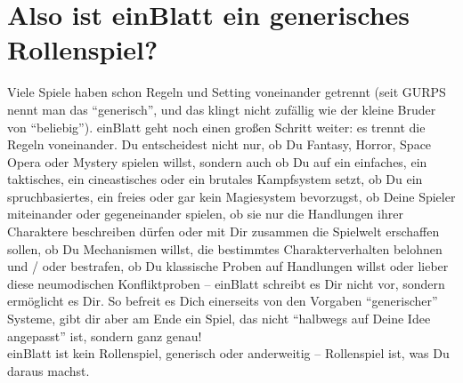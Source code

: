 \section {Also ist einBlatt ein generisches Rollenspiel?}
Viele Spiele haben schon Regeln und Setting voneinander getrennt (seit GURPS nennt man das "`generisch"', und das klingt nicht zufällig wie der kleine Bruder von "`beliebig"'). einBlatt geht noch einen großen Schritt weiter: es trennt die Regeln voneinander. Du entscheidest nicht nur, ob Du Fantasy, Horror, Space Opera oder Mystery spielen willst, sondern auch ob Du auf ein einfaches, ein taktisches, ein cineastisches oder ein brutales Kampfsystem setzt, ob Du ein spruchbasiertes, ein freies oder gar kein Magiesystem bevorzugst, ob Deine Spieler miteinander oder gegeneinander spielen, ob sie nur die Handlungen ihrer Charaktere beschreiben dürfen oder mit Dir zusammen die Spielwelt erschaffen sollen, ob Du Mechanismen willst, die bestimmtes Charakterverhalten belohnen und / oder bestrafen, ob Du klassische Proben auf Handlungen willst oder lieber diese neumodischen Konfliktproben -- einBlatt schreibt es Dir nicht vor, sondern ermöglicht es Dir. So befreit es Dich einerseits von den Vorgaben "`generischer"' Systeme, gibt dir aber am Ende ein Spiel, das nicht "`halbwegs auf Deine Idee angepasst"' ist, sondern ganz genau!
\\
einBlatt ist kein Rollenspiel, generisch oder anderweitig -- Rollenspiel ist, was Du daraus machst.

